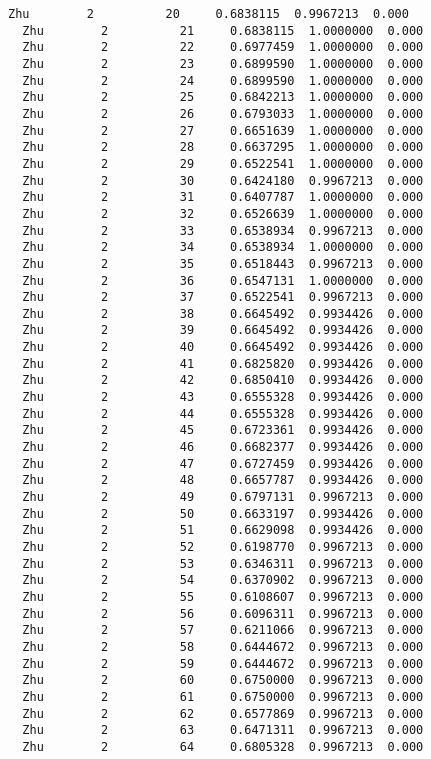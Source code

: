 \documentclass[11pt]{article}
\begin{document}
\begin{Verbatim}[commandchars=\\\{\}]
  Zhu        2          20     0.6838115  0.9967213  0.000
  Zhu        2          21     0.6838115  1.0000000  0.000
  Zhu        2          22     0.6977459  1.0000000  0.000
  Zhu        2          23     0.6899590  1.0000000  0.000
  Zhu        2          24     0.6899590  1.0000000  0.000
  Zhu        2          25     0.6842213  1.0000000  0.000
  Zhu        2          26     0.6793033  1.0000000  0.000
  Zhu        2          27     0.6651639  1.0000000  0.000
  Zhu        2          28     0.6637295  1.0000000  0.000
  Zhu        2          29     0.6522541  1.0000000  0.000
  Zhu        2          30     0.6424180  0.9967213  0.000
  Zhu        2          31     0.6407787  1.0000000  0.000
  Zhu        2          32     0.6526639  1.0000000  0.000
  Zhu        2          33     0.6538934  0.9967213  0.000
  Zhu        2          34     0.6538934  1.0000000  0.000
  Zhu        2          35     0.6518443  0.9967213  0.000
  Zhu        2          36     0.6547131  1.0000000  0.000
  Zhu        2          37     0.6522541  0.9967213  0.000
  Zhu        2          38     0.6645492  0.9934426  0.000
  Zhu        2          39     0.6645492  0.9934426  0.000
  Zhu        2          40     0.6645492  0.9934426  0.000
  Zhu        2          41     0.6825820  0.9934426  0.000
  Zhu        2          42     0.6850410  0.9934426  0.000
  Zhu        2          43     0.6555328  0.9934426  0.000
  Zhu        2          44     0.6555328  0.9934426  0.000
  Zhu        2          45     0.6723361  0.9934426  0.000
  Zhu        2          46     0.6682377  0.9934426  0.000
  Zhu        2          47     0.6727459  0.9934426  0.000
  Zhu        2          48     0.6657787  0.9934426  0.000
  Zhu        2          49     0.6797131  0.9967213  0.000
  Zhu        2          50     0.6633197  0.9934426  0.000
  Zhu        2          51     0.6629098  0.9934426  0.000
  Zhu        2          52     0.6198770  0.9967213  0.000
  Zhu        2          53     0.6346311  0.9967213  0.000
  Zhu        2          54     0.6370902  0.9967213  0.000
  Zhu        2          55     0.6108607  0.9967213  0.000
  Zhu        2          56     0.6096311  0.9967213  0.000
  Zhu        2          57     0.6211066  0.9967213  0.000
  Zhu        2          58     0.6444672  0.9967213  0.000
  Zhu        2          59     0.6444672  0.9967213  0.000
  Zhu        2          60     0.6750000  0.9967213  0.000
  Zhu        2          61     0.6750000  0.9967213  0.000
  Zhu        2          62     0.6577869  0.9967213  0.000
  Zhu        2          63     0.6471311  0.9967213  0.000
  Zhu        2          64     0.6805328  0.9967213  0.000

\end{Verbatim}
\end{document}
